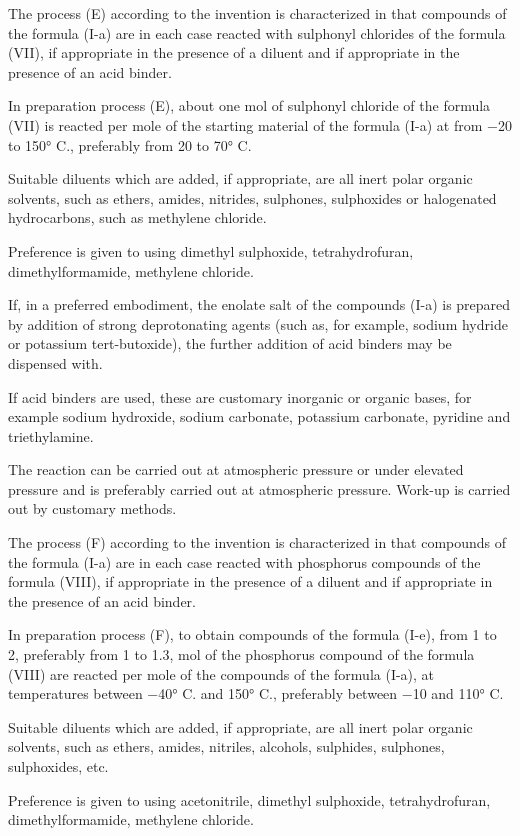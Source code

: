\documentclass[11pt,a4paper]{article}
\begin{document}
The process (E) according to the invention is characterized in that compounds of the formula (I-a) are in each case reacted with sulphonyl chlorides of the formula (VII), if appropriate in the presence of a diluent and if appropriate in the presence of an acid binder.

In preparation process (E), about one mol of sulphonyl chloride of the formula (VII) is reacted per mole of the starting material of the formula (I-a) at from −20 to 150° C., preferably from 20 to 70° C.

Suitable diluents which are added, if appropriate, are all inert polar organic solvents, such as ethers, amides, nitrides, sulphones, sulphoxides or halogenated hydrocarbons, such as methylene chloride.

Preference is given to using dimethyl sulphoxide, tetrahydrofuran, dimethylformamide, methylene chloride.

If, in a preferred embodiment, the enolate salt of the compounds (I-a) is prepared by addition of strong deprotonating agents (such as, for example, sodium hydride or potassium tert-butoxide), the further addition of acid binders may be dispensed with.

If acid binders are used, these are customary inorganic or organic bases, for example sodium hydroxide, sodium carbonate, potassium carbonate, pyridine and triethylamine.

The reaction can be carried out at atmospheric pressure or under elevated pressure and is preferably carried out at atmospheric pressure. Work-up is carried out by customary methods.

The process (F) according to the invention is characterized in that compounds of the formula (I-a) are in each case reacted with phosphorus compounds of the formula (VIII), if appropriate in the presence of a diluent and if appropriate in the presence of an acid binder.

In preparation process (F), to obtain compounds of the formula (I-e), from 1 to 2, preferably from 1 to 1.3, mol of the phosphorus compound of the formula (VIII) are reacted per mole of the compounds of the formula (I-a), at temperatures between −40° C. and 150° C., preferably between −10 and 110° C.

Suitable diluents which are added, if appropriate, are all inert polar organic solvents, such as ethers, amides, nitriles, alcohols, sulphides, sulphones, sulphoxides, etc.

Preference is given to using acetonitrile, dimethyl sulphoxide, tetrahydrofuran, dimethylformamide, methylene chloride.
\end{document}
